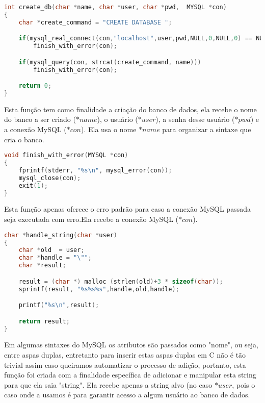 \begin{lstlisting}[language=c, caption={fun\c{c}\~{a}o $create\_db()$}, label={lst:dbphi5}]
int create_db(char *name, char *user, char *pwd,  MYSQL *con)
{
	char *create_command = "CREATE DATABASE ";

	if(mysql_real_connect(con,"localhost",user,pwd,NULL,0,NULL,0) == NULL)
		finish_with_error(con);

	if(mysql_query(con, strcat(create_command, name)))
		finish_with_error(con);

	return 0;
}
\end{lstlisting}

Esta fun\c{c}\~{a}o tem como finalidade a cria\c{c}\~{a}o do banco de dados, ela recebe o nome do banco a ser criado
(\textit{$*name$}), o usu\'{a}rio (\textit{$*user$}), a senha desse usu\'{a}rio (\textit{$*pwd$}) e a conex\~{a}o MySQL (\textit{$*con$}). Ela usa o nome \textit{$*name$} para organizar a sintaxe que cria o banco.

\begin{lstlisting}[language=c, caption={fun\c{c}\~{a}o $finish\_with\_error()$}, label={lst:dbphi6}]
void finish_with_error(MYSQL *con)
{
	fprintf(stderr, "%s\n", mysql_error(con));
	mysql_close(con);
	exit(1);
}
\end{lstlisting}

Esta fun\c{c}\~{a}o apenas oferece o erro padr\~{a}o para caso a conex\~{a}o MySQL passada seja executada com 
erro.Ela recebe a conex\~{a}o MySQL (\textit{$*con$}).

\begin{lstlisting}[language=c, caption={fun\c{c}\~{a}o $handle\_string()$}, label={lst:dbphi7}]
char *handle_string(char *user)
{
	char *old  = user;
	char *handle = "\"";
	char *result;

	result = (char *) malloc (strlen(old)+3 * sizeof(char));
	sprintf(result, "%s%s%s",handle,old,handle);

	printf("%s\n",result);

	return result;
}
\end{lstlisting}

Em algumas sintaxes do MySQL os atributos s\~{a}o passados como "nome", ou seja, entre aspas duplas, entretanto para 
inserir estas aspas duplas em C n\~{a}o \'{e} t\~{a}o trivial assim caso queiramos automatizar o processo de 
adi\c{c}\~{a}o, portanto, esta fun\c{c}\~{a}o foi criada com a finalidade espec\'{i}fica de adicionar e manipular 
esta string para que ela saia "string". Ela recebe apenas a string alvo (no caso \textit{$*user$}, pois o caso onde a 
usamos \'{e} para garantir acesso a algum usu\'{a}rio ao banco de dados.

